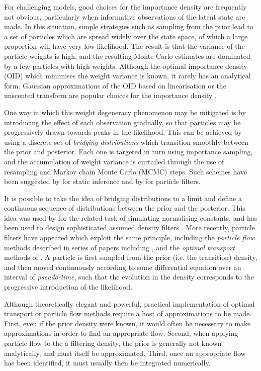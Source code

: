 \documentclass{article}
\begin{document}
For challenging models, good choices for the importance density are frequently not obvious, particularly when informative observations of the latent state are made. In this situation, simple strategies such as sampling from the prior lead to a set of particles which are spread widely over the state space, of which a large proportion will have very low likelihood. The result is that the variance of the particle weights is high, and the resulting Monte Carlo estimates are dominated by a few particles with high weights. Although the optimal importance density (OID) which minimises the weight variance is known, it rarely has an analytical form. Gaussian approximations of the OID based on linearisation or the unscented transform are popular choices for the importance density \citep{Doucet2000a,Merwe2000}.

One way in which this weight degeneracy phenomenon may be mitigated is by introducing the effect of each observation gradually, so that particles may be progressively drawn towards peaks in the likelihood. This can be achieved by using a discrete set of \emph{bridging distributions} which transition smoothly between the prior and posterior. Each one is targeted in turn using importance sampling, and the accumulation of weight variance is curtailed through the use of resampling and Markov chain Monte Carlo (MCMC) steps. Such schemes have been suggested by \citet{Neal2001,DelMoral2006} for static inference and by \citet{Godsill2001b,Gall2007,Deutscher2000,Oudjane2000} for particle filters.

It is possible to take the idea of bridging distributions to a limit and define a continuous sequence of distributions between the prior and the posterior. This idea was used by \citet{Gelman1998} for the related task of simulating normalising constants, and has been used to design sophisticated assumed density filters \citep{Hanebeck2003a,Hanebeck2012,Hagmar2011}. More recently, particle filters have appeared which exploit the same principle, including the \emph{particle flow} methods described in series of papers including \citep{Daum2008,Daum2011d}, and the \emph{optimal transport} methods of \cite{Reich2011,Reich2012a}. A particle is first sampled from the prior (i.e. the transition) density, and then moved continuously according to some differential equation over an interval of \emph{pseudo-time}, such that the evolution in the density corresponds to the progressive introduction of the likelihood.

Although theoretically elegant and powerful, practical implementation of optimal transport or particle flow methods require a host of approximations to be made. First, even if the prior density were known, it would often be necessary to make approximations in order to find an appropriate flow. Second, when applying particle flow to the a filtering density, the prior is generally not known analytically, and must itself be approximated. Third, once an appropriate flow has been identified, it must usually then be integrated numerically.
\end{document}
